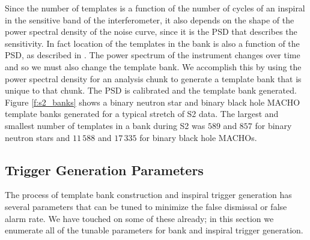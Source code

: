 Since the number of templates is a function of the number of cycles of an
inspiral in the sensitive band of the interferometer, it also depends on the
shape of the power spectral density of the noise curve, since it is the PSD
that describes the sensitivity. In fact location of the templates in the bank is
also a function of the PSD, as described in \cite{Owen:1998dk}. The power
spectrum of the instrument changes over time and so we must also change the
template bank. We accomplish this by using the power spectral density for an
analysis chunk to generate a template bank that is unique to that chunk. The
PSD is calibrated and the template bank generated. Figure \ref{f:s2_banks}
shows a binary neutron star and binary black hole MACHO template banks
generated for a typical stretch of S2 data.  The largest and smallest number
of templates in a bank during S2 was $589$ and $857$ for binary neutron stars
and $11\,588$ and $17\,335$ for binary black hole MACHOs.

\subsection{Trigger Generation Parameters}
\label{ss:triggerparameters}

The process of template bank construction and inspiral trigger generation has
several parameters that can be tuned to minimize the false dismissal or false
alarm rate. We have touched on some of these already; in this section we
enumerate all of the tunable parameters for bank and inspiral trigger
generation.

